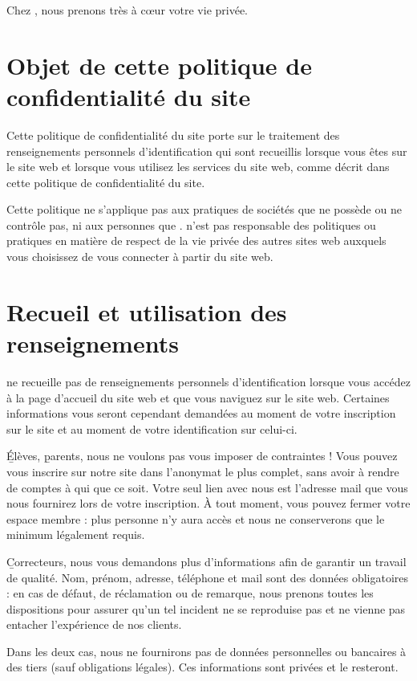 Chez \eDevoir, nous prenons très à cœur votre vie privée.

\section{Objet de cette politique de confidentialité du site}

Cette politique de confidentialité du site porte sur le traitement des renseignements personnels d'identification qui sont recueillis lorsque vous êtes sur le site web et lorsque vous utilisez les services du site web, comme décrit dans cette politique de confidentialité du site.

Cette politique ne s'applique pas aux pratiques de sociétés que \eDevoir ne possède ou ne contrôle pas, ni aux personnes que \eDevoir. \eDevoir n'est pas responsable des politiques ou pratiques en matière de respect de la vie privée des autres sites web auxquels vous choisissez de vous connecter à partir du site web.

\section{Recueil et utilisation des renseignements}

\eDevoir ne recueille pas de renseignements personnels d'identification lorsque vous accédez à la page d'accueil du site web et que vous naviguez sur le site web. Certaines informations vous seront cependant demandées au moment de votre inscription sur le site et au moment de votre identification sur celui-ci.

\b{Élèves}, \b{parents}, nous ne voulons pas vous imposer de contraintes ! Vous pouvez vous inscrire sur notre site dans l'anonymat le plus complet, sans avoir à rendre de comptes à qui que ce soit. Votre seul lien avec nous est l'adresse mail que vous nous fournirez lors de votre inscription. À tout moment, vous pouvez fermer votre espace membre : plus personne n'y aura accès et nous ne conserverons que le minimum légalement requis.

\b{Correcteurs}, nous vous demandons plus d'informations afin de garantir un travail de qualité.  Nom, prénom, adresse, téléphone et mail sont des données obligatoires : en cas de défaut, de réclamation ou de remarque, nous prenons toutes les dispositions pour assurer qu'un tel incident ne se reproduise pas et ne vienne pas entacher l'expérience de nos clients.

Dans les deux cas, nous ne fournirons pas de données personnelles ou bancaires à des tiers (sauf obligations légales). Ces informations sont privées et le resteront.

